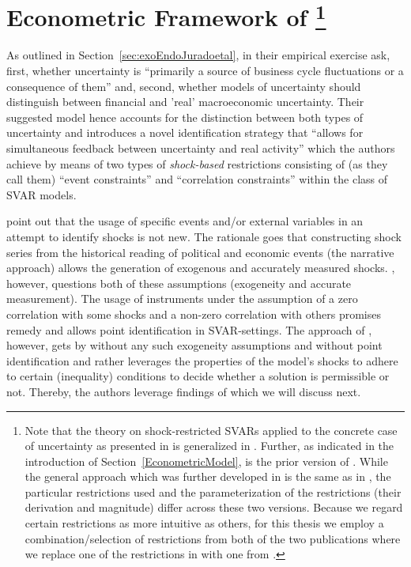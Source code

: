 \documentclass[a4paper,11pt,listof=nochaptergap,oneside,pointednumbers,bibtotoc,bigheadings,liststotoc,hidelinks]{scrbook}
\theoremstyle{mysatz}
\theoremstyle{mydefinition}
\theoremstyle{mytheorem}
\theoremstyle{mybemerkung}
\begin{document}
\section[Econometric Framework of \citep{ludvigsonetal:18,ludvigsonetal:19}]{Econometric Framework of \citep{ludvigsonetal:18,ludvigsonetal:19}\footnote{Note that the theory on shock-restricted SVARs applied to the concrete case of uncertainty as presented in \citep{ludvigsonetal:18,ludvigsonetal:19} is generalized in \citep{ludvigsonetal:17,ludvigsonetal:20a}. Further, as indicated in the introduction of Section~\ref{EconometricModel}, \citet{ludvigsonetal:18} is the prior version of \citet{ludvigsonetal:19}. While the general approach which was further developed in \citet{ludvigsonetal:19} is the same as in \citet{ludvigsonetal:18}, the particular restrictions used and the parameterization of the restrictions (their derivation and magnitude) differ across these two versions. Because we regard certain restrictions as more intuitive as others, for this thesis we employ a combination/selection of restrictions from both of the two publications where we replace one of the restrictions in \citet{ludvigsonetal:19} with one from \citet{ludvigsonetal:18}.}}
\label{sec:econometricframeworkLMN}

As outlined in Section~\ref{sec:exoEndoJuradoetal}, in their empirical exercise \citet[p. 2]{ludvigsonetal:19} ask, first, whether uncertainty is ``primarily a source of business cycle fluctuations or a consequence of them'' and, second, whether models of uncertainty should distinguish between financial and 'real' macroeconomic uncertainty. Their suggested model hence accounts for the distinction between both types of uncertainty and introduces a novel identification strategy that ``allows for simultaneous feedback between uncertainty and real activity'' which the authors achieve by means of two types of \textit{shock-based} restrictions consisting of (as they call them) ``event constraints'' and ``correlation constraints'' within the class of SVAR models. 

\citet{ludvigsonetal:19} point out that the usage of specific events and/or external variables in an attempt to identify shocks is not new. The rationale goes that constructing shock series from the historical reading of political and economic events (the narrative approach) allows the generation of exogenous and accurately measured shocks. \citet{ramey:16}, however, questions both of these assumptions (exogeneity and accurate measurement). The usage of instruments under the assumption of a zero correlation with some shocks and a non-zero correlation with others promises remedy and allows point identification in SVAR-settings. The approach of \citet{ludvigsonetal:19}, however, gets by without any such exogeneity assumptions and without point identification and rather leverages the properties of the model's shocks to adhere to certain (inequality) conditions to decide whether a solution is permissible or not. Thereby, the authors leverage findings of \citet{rubioetal:10} which we will discuss next.
\end{document}
